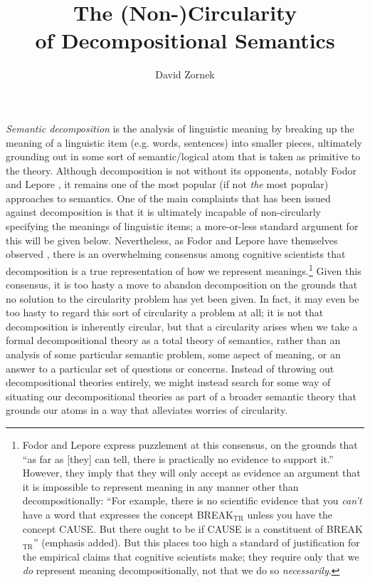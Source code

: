 \documentclass[12pt]{amsart}
\title{The (Non-)Circularity \\ of Decompositional Semantics}
\author{David Zornek}
\date{} %
\begin{document}
\maketitle

\emph{Semantic decomposition} is the analysis of linguistic meaning by breaking up the meaning of a linguistic item (e.g. words, sentences) into smaller pieces, ultimately grounding out in some sort of semantic/logical atom that is taken as primitive to the theory. Although decomposition is not without its opponents, notably Fodor and Lepore \cite{fodor_emptiness_1998} \cite{fodor_morphemes_2000} \cite{fodor_impossible_1999} \cite{fodor_impossible_2005}, it remains one of the most popular (if not \emph{the} most popular) approaches to semantics. One of the main complaints that has been issued against decomposition is that it is ultimately incapable of non-circularly specifying the meanings of linguistic items; a more-or-less standard argument for this will be given below. Nevertheless, as Fodor and Lepore have themselves observed \cite{fodor_impossible_2005}, there is an overwhelming consensus among cognitive scientists that decomposition is a true representation of how we represent meanings.\footnote{Fodor and Lepore express puzzlement at this consensus, on the grounds that ``as far as [they] can tell, there is practically no evidence to support it.'' However, they imply that they will only accept as evidence an argument that it is impossible to represent meaning in any manner other than decompositionally: ``For example, there is no scientific evidence that you \emph{can't} have a word that expresses the concept BREAK$_\text{TR}$ unless you have the concept CAUSE. But there ought to be if CAUSE is a constituent of BREAK$_\text{TR}$'' (emphasis added). But this places too high a standard of justification for the empirical claims that cognitive scientists make; they require only that we \emph{do} represent meaning decompositionally, not that we do so \emph{necessarily}.} Given this consensus, it is too hasty a move to abandon decomposition on the grounds that no solution to the circularity problem has yet been given. In fact, it may even be too hasty to regard this sort of circularity a problem at all; it is not that decomposition is inherently circular, but that a circularity arises when we take a formal decompositional theory as a total theory of semantics, rather than an analysis of some particular semantic problem, some aspect of meaning, or an answer to a particular set of questions or concerns. Instead of throwing out decompositional theories entirely, we might instead search for some way of situating our decompositional theories as part of a broader semantic theory that grounds our atoms in a way that alleviates worries of circularity.
\end{document}
